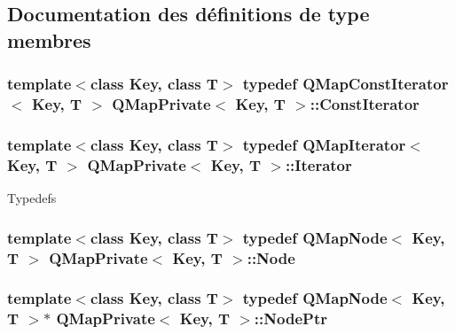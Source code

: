 \subsection{Documentation des définitions de type membres}
\hypertarget{class_q_map_private_a579a86f244015186e41bfa3cf85a5054}{}
\subsubsection[{Const\+Iterator}]{\setlength{\rightskip}{0pt plus 5cm}template$<$class Key, class T$>$ typedef {\bf Q\+Map\+Const\+Iterator}$<$ Key, T $>$ {\bf Q\+Map\+Private}$<$ Key, T $>$\+::{\bf Const\+Iterator}}\label{class_q_map_private_a579a86f244015186e41bfa3cf85a5054}
\hypertarget{class_q_map_private_a5326545ba578532909650c2f4a8d4d34}{}
\subsubsection[{Iterator}]{\setlength{\rightskip}{0pt plus 5cm}template$<$class Key, class T$>$ typedef {\bf Q\+Map\+Iterator}$<$ Key, T $>$ {\bf Q\+Map\+Private}$<$ Key, T $>$\+::{\bf Iterator}}\label{class_q_map_private_a5326545ba578532909650c2f4a8d4d34}
Typedefs \hypertarget{class_q_map_private_a14bbee368a168ea06680b51eef901c27}{}
\subsubsection[{Node}]{\setlength{\rightskip}{0pt plus 5cm}template$<$class Key, class T$>$ typedef {\bf Q\+Map\+Node}$<$ Key, T $>$ {\bf Q\+Map\+Private}$<$ Key, T $>$\+::{\bf Node}}\label{class_q_map_private_a14bbee368a168ea06680b51eef901c27}
\hypertarget{class_q_map_private_a6b529a90a461f2d2df3e1b2356250fb4}{}
\subsubsection[{Node\+Ptr}]{\setlength{\rightskip}{0pt plus 5cm}template$<$class Key, class T$>$ typedef {\bf Q\+Map\+Node}$<$ Key, T $>$$\ast$ {\bf Q\+Map\+Private}$<$ Key, T $>$\+::{\bf Node\+Ptr}}\label{class_q_map_private_a6b529a90a461f2d2df3e1b2356250fb4}


